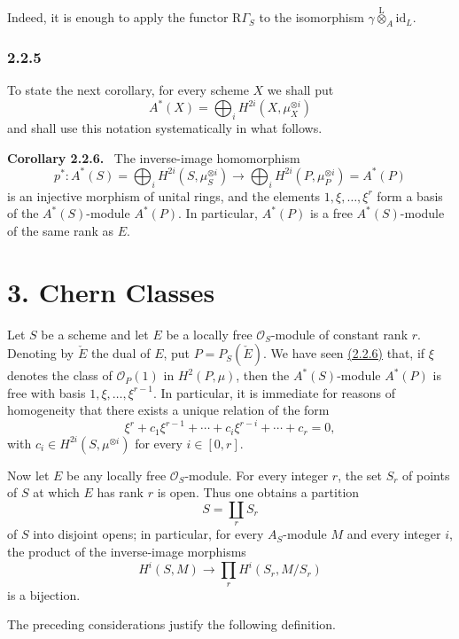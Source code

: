\documentclass[11pt]{article}
\newenvironment{statement}[1]{\par\medskip\noindent\textbf{#1.}\ }{\par\medskip}
\providecommand{\lten}{\overset{\mathrm L}{\otimes}}
\providecommand{\lten}{\overset{\mathrm L}{\otimes}}
\providecommand{\lten}{\overset{\mathrm L}{\otimes}}
\providecommand{\lten}{\overset{\mathrm L}{\otimes}}
\providecommand{\lten}{\overset{\mathrm L}{\otimes}}
\providecommand{\lten}{\overset{\mathrm L}{\otimes}}
\providecommand{\lten}{\overset{\mathrm L}{\otimes}}
\begin{document}
Indeed, it is enough to apply the functor $\mathrm R\Gamma_S$ to the isomorphism $\gamma\lten_A\mathrm{id}_L$.

\subsubsection*{2.2.5}\label{sga5:VII:subsubsection:2.2.5}
To state the next corollary, for every scheme $X$ we shall put
\[
A^*(X)=\bigoplus_i H^{2i}(X,\mu_X^{\otimes i})
\]
and shall use this notation systematically in what follows.

\label{sga5:VII:corollary:2.2.6}\begin{statement}{Corollary 2.2.6}
The inverse-image homomorphism
\[
p^*:A^*(S)=\bigoplus_i H^{2i}(S,\mu_S^{\otimes i})
\longrightarrow
\bigoplus_i H^{2i}(P,\mu_P^{\otimes i})=A^*(P)
\]
is an injective morphism of unital rings, and the elements $1,\xi,\ldots,\xi^r$ form a basis of the $A^*(S)$-module $A^*(P)$. In particular, $A^*(P)$ is a free $A^*(S)$-module of the same rank as $E$.
\end{statement}

\section*{3. Chern Classes}\label{sga5:VII:section:3}

Let $S$ be a scheme and let $E$ be a locally free $\mathcal O_S$-module of constant rank $r$. Denoting by $\check E$ the dual of $E$, put $P=P_S(\check E)$. We have seen \hyperref[sga5:VII:corollary:2.2.6]{(2.2.6)} that, if $\xi$ denotes the class of $\mathcal O_P(1)$ in $H^2(P,\mu)$, then the $A^*(S)$-module $A^*(P)$ is free with basis $1,\xi,\ldots,\xi^{r-1}$. In particular, it is immediate for reasons of homogeneity that there exists a unique relation of the form
\[
\xi^r+c_1\xi^{r-1}+\cdots+c_i\xi^{r-i}+\cdots+c_r=0,
\tag{3.1}\label{sga5:VII:equation:3.1}
\]
with $c_i\in H^{2i}(S,\mu^{\otimes i})$ for every $i\in[0,r]$.

Now let $E$ be any locally free $\mathcal O_S$-module. For every integer $r$, the set $S_r$ of points of $S$ at which $E$ has rank $r$ is open. Thus one obtains a partition
\[
S=\coprod_r S_r
\]
of $S$ into disjoint opens; in particular, for every $A_S$-module $M$ and every integer $i$, the product of the inverse-image morphisms
\[
H^i(S,M)\longrightarrow \prod_r H^i(S_r,M/S_r)
\]
is a bijection.

The preceding considerations justify the following definition.
\end{document}
